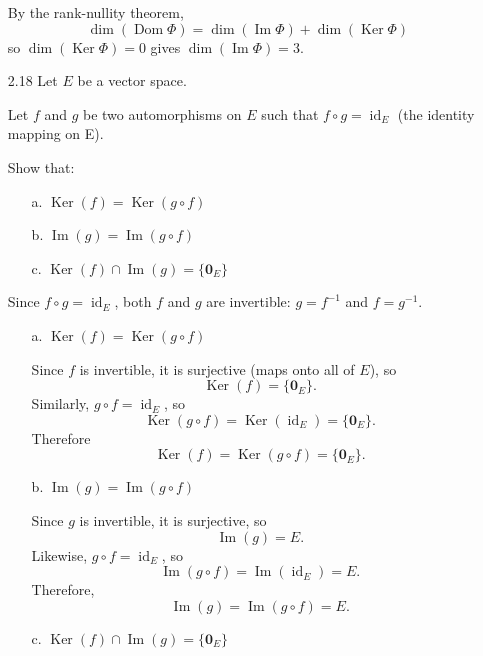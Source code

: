 \documentclass[11pt]{article}
\newcommand{\vect}[1]{\bm{#1}}      %
\DeclareMathOperator{\Ker}{Ker}
\DeclareMathOperator{\Img}{Im}
\DeclareMathOperator{\Dom}{Dom}
\DeclareMathOperator{\id}{id}
\theoremstyle{definition}
\theoremstyle{plain}
\theoremstyle{remark}
\begin{document}
\begin{enumerate}
          By the rank-nullity theorem,
          \[
              \dim(\Dom \Phi) = \dim(\Img \Phi) + \dim(\Ker \Phi)
          \]
          so $\dim(\Ker \Phi) = 0$ gives $\dim(\Img \Phi) = 3$.

          \pagebreak

    \item[2.18] Let $E$ be a vector space.

          Let $f$ and $g$ be two automorphisms on $E$ such that $f \circ g = \id_E$ (the identity mapping on E).

          Show that:
          \begin{enumerate}
              \item[a.] $\Ker(f) = \Ker(g \circ f)$
              \item[b.] $\Img(g) = \Img(g \circ f)$
              \item[c.] $\Ker(f) \cap \Img(g) = \{ \vect{0}_E \}$
          \end{enumerate}

          Since $f \circ g = \id_E$, both $f$ and $g$ are invertible: $g = f^{-1}$ and $f = g^{-1}$.

          \begin{enumerate}
              \item[a.] $\Ker(f) = \Ker(g \circ f)$

                    Since $f$ is invertible, it is surjective (maps onto all of $E$), so
                    \[
                        \Ker(f) = \{ \vect{0}_E \}.
                    \]
                    Similarly, $g \circ f = \id_E$, so
                    \[
                        \Ker(g \circ f) = \Ker(\id_E) = \{ \vect{0}_E \}.
                    \]
                    Therefore
                    \[
                        \Ker(f) = \Ker(g \circ f) = \{ \vect{0}_E \}.
                    \]

              \item[b.] $\Img(g) = \Img(g \circ f)$

                    Since $g$ is invertible, it is surjective, so
                    \[
                        \Img(g) = E.
                    \]
                    Likewise, $g \circ f = \id_E$, so
                    \[
                        \Img(g \circ f) = \Img(\id_E) = E.
                    \]
                    Therefore,
                    \[
                        \Img(g) = \Img(g \circ f) = E.
                    \]

              \item[c.] $\Ker(f) \cap \Img(g) = \{ \vect{0}_E \}$


\end{enumerate}
\end{enumerate}
\end{document}
